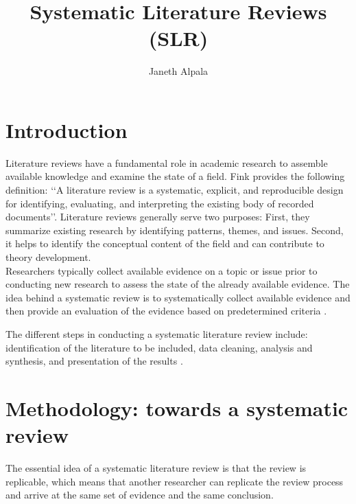 \documentclass[letterpaper,10pt]{article}
\begin{document}
\title{Systematic Literature Reviews (SLR)}


\author{Janeth Alpala }

\address{  Universidade Federal de Pernambuco\\
}






\section{Introduction}

Literature reviews have a fundamental role in academic research to assemble available knowledge and examine the state of a field.
Fink \cite{fink2019conducting} provides the following definition: ‘‘A literature review is a systematic, explicit, and reproducible design for identifying, evaluating, and interpreting the existing body of recorded documents’’.  Literature reviews generally serve two purposes: First, they summarize existing research by identifying patterns, themes, and issues. Second, it helps to identify the conceptual content of the field and can contribute to theory development.\\

Researchers typically collect available evidence on a topic or issue prior to conducting new research to assess the state of the
already available evidence. The idea behind a systematic review is to systematically collect available evidence and then provide an evaluation of the evidence based on predetermined criteria \cite{Tranfield2003}.

The different steps in conducting a systematic literature review include: identification of the literature to be included, data cleaning, analysis and synthesis, and presentation of the results \cite{Linnenluecke2019}.


\section{ Methodology: towards a systematic review}

The essential idea of a systematic literature review is that the review is replicable, which means that another researcher can replicate the review process and arrive at the same set of evidence and the same conclusion.
\end{document}
